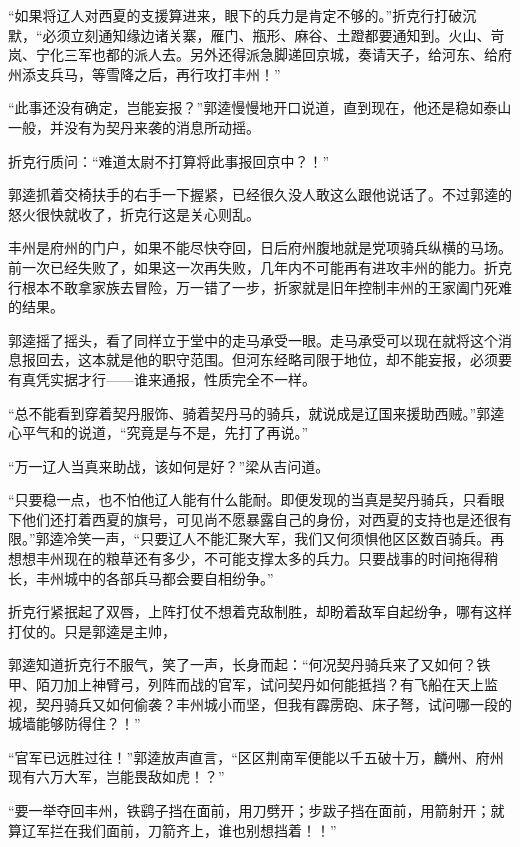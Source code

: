 “如果将辽人对西夏的支援算进来，眼下的兵力是肯定不够的。”折克行打破沉默，“必须立刻通知缘边诸关寨，雁门、瓶形、麻谷、土蹬都要通知到。火山、岢岚、宁化三军也都的派人去。另外还得派急脚递回京城，奏请天子，给河东、给府州添支兵马，等雪降之后，再行攻打丰州！”

“此事还没有确定，岂能妄报？”郭逵慢慢地开口说道，直到现在，他还是稳如泰山一般，并没有为契丹来袭的消息所动摇。

折克行质问：“难道太尉不打算将此事报回京中？！”

郭逵抓着交椅扶手的右手一下握紧，已经很久没人敢这么跟他说话了。不过郭逵的怒火很快就收了，折克行这是关心则乱。

丰州是府州的门户，如果不能尽快夺回，日后府州腹地就是党项骑兵纵横的马场。前一次已经失败了，如果这一次再失败，几年内不可能再有进攻丰州的能力。折克行根本不敢拿家族去冒险，万一错了一步，折家就是旧年控制丰州的王家阖门死难的结果。

郭逵摇了摇头，看了同样立于堂中的走马承受一眼。走马承受可以现在就将这个消息报回去，这本就是他的职守范围。但河东经略司限于地位，却不能妄报，必须要有真凭实据才行——谁来通报，性质完全不一样。

“总不能看到穿着契丹服饰、骑着契丹马的骑兵，就说成是辽国来援助西贼。”郭逵心平气和的说道，“究竟是与不是，先打了再说。”

“万一辽人当真来助战，该如何是好？”梁从吉问道。

“只要稳一点，也不怕他辽人能有什么能耐。即便发现的当真是契丹骑兵，只看眼下他们还打着西夏的旗号，可见尚不愿暴露自己的身份，对西夏的支持也是还很有限。”郭逵冷笑一声，“只要辽人不能汇聚大军，我们又何须惧他区区数百骑兵。再想想丰州现在的粮草还有多少，不可能支撑太多的兵力。只要战事的时间拖得稍长，丰州城中的各部兵马都会要自相纷争。”

折克行紧抿起了双唇，上阵打仗不想着克敌制胜，却盼着敌军自起纷争，哪有这样打仗的。只是郭逵是主帅，

郭逵知道折克行不服气，笑了一声，长身而起：“何况契丹骑兵来了又如何？铁甲、陌刀加上神臂弓，列阵而战的官军，试问契丹如何能抵挡？有飞船在天上监视，契丹骑兵又如何偷袭？丰州城小而坚，但我有霹雳砲、床子弩，试问哪一段的城墙能够防得住？！”

“官军已远胜过往！”郭逵放声直言，“区区荆南军便能以千五破十万，麟州、府州现有六万大军，岂能畏敌如虎！？”

“要一举夺回丰州，铁鹞子挡在面前，用刀劈开；步跋子挡在面前，用箭射开；就算辽军拦在我们面前，刀箭齐上，谁也别想挡着！！”

